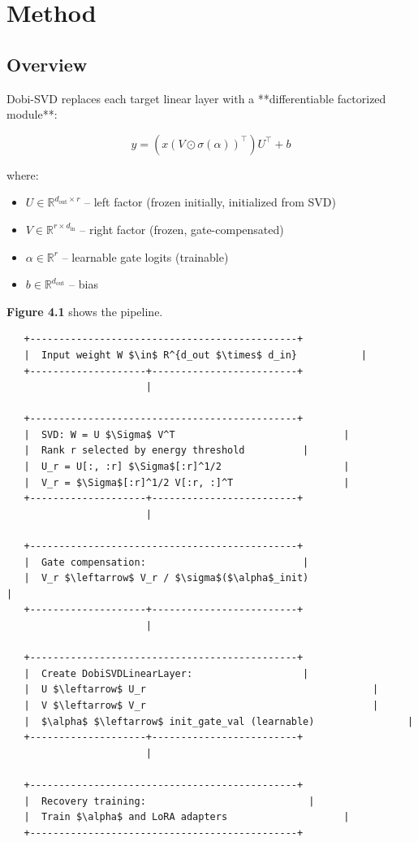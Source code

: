
\section{Method}

\subsection{Overview}

Dobi-SVD replaces each target linear layer with a **differentiable 
factorized module**:

\[
y = (x (V \odot \sigma(\alpha))^\top) U^\top + b
\tag{4.1}
\]

where:

\begin{itemize}
\item $U \in \mathbb{R}^{d_\text{out} \times r}$ -- left factor (frozen initially, initialized from SVD)
\item $V \in \mathbb{R}^{r \times d_\text{in}}$ -- right factor (frozen, gate-compensated)
\item $\alpha \in \mathbb{R}^r$ -- learnable gate logits (trainable)
\item $b \in \mathbb{R}^{d_\text{out}}$ -- bias

\end{itemize}
\textbf{Figure 4.1} shows the pipeline.

\begin{lstlisting}
   +----------------------------------------------+
   |  Input weight W $\in$ R^{d_out $\times$ d_in}           |
   +--------------------+-------------------------+
                        |
                         
   +----------------------------------------------+
   |  SVD: W = U $\Sigma$ V^T                             |
   |  Rank r selected by energy threshold          |
   |  U_r = U[:, :r] $\Sigma$[:r]^1/2                     |
   |  V_r = $\Sigma$[:r]^1/2 V[:r, :]^T                   |
   +--------------------+-------------------------+
                        |
                         
   +----------------------------------------------+
   |  Gate compensation:                           |
   |  V_r $\leftarrow$ V_r / $\sigma$($\alpha$_init)                        |
   +--------------------+-------------------------+
                        |
                         
   +----------------------------------------------+
   |  Create DobiSVDLinearLayer:                   |
   |  U $\leftarrow$ U_r                                       |
   |  V $\leftarrow$ V_r                                       |
   |  $\alpha$ $\leftarrow$ init_gate_val (learnable)                |
   +--------------------+-------------------------+
                        |
                         
   +----------------------------------------------+
   |  Recovery training:                            |
   |  Train $\alpha$ and LoRA adapters                    |
   +----------------------------------------------+
\end{lstlisting}


